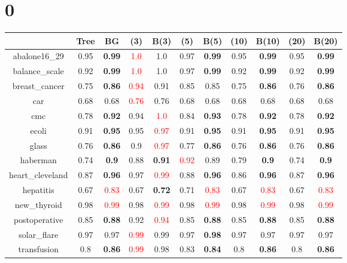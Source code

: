 \documentclass{article}%
\begin{document}
%
\normalsize%
\section*{0}%
\begin{tabular}{c|cccccccccc}%
\hline%
&Tree&BG&(3)&B(3)&(5)&B(5)&(10)&B(10)&(20)&B(20)\\%
\hline%
abalone16\_29&0.95&\textbf{0.99}&\textcolor{red}{ 
1.0
}&1.0&0.97&\textbf{0.99}&0.95&\textbf{0.99}&0.95&\textbf{0.99}\\%
\hline%
balance\_scale&0.92&\textbf{0.99}&\textcolor{red}{ 
1.0
}&1.0&0.97&\textbf{0.99}&0.92&\textbf{0.99}&0.92&\textbf{0.99}\\%
\hline%
breast\_cancer&0.75&\textbf{0.86}&\textcolor{red}{ 
0.94
}&0.91&0.85&0.85&0.75&\textbf{0.86}&0.76&\textbf{0.86}\\%
\hline%
car&0.68&0.68&\textcolor{red}{ 
0.76
}&0.76&0.68&0.68&0.68&0.68&0.68&0.68\\%
\hline%
cmc&0.78&\textbf{0.92}&0.94&\textcolor{red}{ 
1.0
}&0.84&\textbf{0.93}&0.78&\textbf{0.92}&0.78&\textbf{0.92}\\%
\hline%
ecoli&0.91&\textbf{0.95}&0.95&\textcolor{red}{ 
0.97
}&0.91&\textbf{0.95}&0.91&\textbf{0.95}&0.91&\textbf{0.95}\\%
\hline%
glass&0.76&\textbf{0.86}&0.9&\textcolor{red}{ 
0.97
}&0.77&\textbf{0.86}&0.76&\textbf{0.86}&0.76&\textbf{0.86}\\%
\hline%
haberman&0.74&\textbf{0.9}&0.88&\textbf{0.91}&\textcolor{red}{ 
0.92
}&0.89&0.79&\textbf{0.9}&0.74&\textbf{0.9}\\%
\hline%
heart\_cleveland&0.87&\textbf{0.96}&0.97&\textcolor{red}{ 
0.99
}&0.88&\textbf{0.96}&0.86&\textbf{0.96}&0.87&\textbf{0.96}\\%
\hline%
hepatitis&0.67&\textcolor{red}{ 
0.83
}&0.67&\textbf{0.72}&0.71&\textcolor{red}{ 
0.83
}&0.67&\textcolor{red}{ 
0.83
}&0.67&\textcolor{red}{ 
0.83
}\\%
\hline%
new\_thyroid&0.98&\textcolor{red}{ 
0.99
}&0.98&\textcolor{red}{ 
0.99
}&0.98&\textcolor{red}{ 
0.99
}&0.98&\textcolor{red}{ 
0.99
}&0.98&\textcolor{red}{ 
0.99
}\\%
\hline%
postoperative&0.85&\textbf{0.88}&0.92&\textcolor{red}{ 
0.94
}&0.85&\textbf{0.88}&0.85&\textbf{0.88}&0.85&\textbf{0.88}\\%
\hline%
solar\_flare&0.97&0.97&\textcolor{red}{ 
0.99
}&0.99&0.97&\textbf{0.98}&0.97&0.97&0.97&0.97\\%
\hline%
transfusion&0.8&\textbf{0.86}&\textcolor{red}{ 
0.99
}&0.98&0.83&\textbf{0.84}&0.8&\textbf{0.86}&0.8&\textbf{0.86}\\%

\end{tabular}
\end{document}
